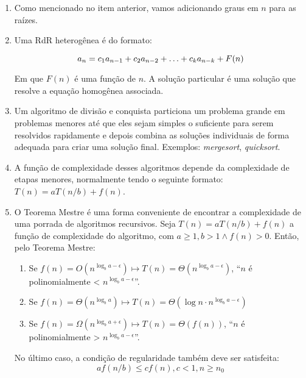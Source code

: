 \documentclass{article}
\begin{document}
\begin{enumerate}
	\item Como mencionado no item anterior, vamos adicionando graus em \( n \) para as raízes.

	\item Uma RdR heterogênea é do formato:

	      \[ a_n = c_1 a_{n-1} + c_2 a_{n-2} + \mathellipsis + c_k a_{n-k} + F(n)\]

	      Em que \( F(n) \) é uma função de \( n \). A solução particular é uma solução que resolve a equação homogênea associada.

	\item Um algoritmo de divisão e conquista particiona um problema grande em problemas menores até que eles sejam simples o suficiente para serem resolvidos rapidamente e depois combina as soluções individuais de forma adequada para criar uma solução final. Exemplos: \textit{mergesort}, \textit{quicksort}.

	\item A função de complexidade desses algoritmos depende da complexidade de etapas menores, normalmente tendo o seguinte formato: \( T(n) = aT(n/b) + f(n) \).

	\item O Teorema Mestre é uma forma conveniente de encontrar a complexidade de uma porrada de algoritmos recursivos. Seja \( T(n) = aT(n/b) + f(n) \) a função de complexidade do algoritmo, com \( a \geq 1, b > 1 \land f(n) > 0 \). Então, pelo Teorema Mestre:

	      \begin{enumerate}

		      \item Se \( f(n) = O(n^{\log_b {a- \epsilon}}) \mapsto T(n) = \Theta(n^{\log_b {a - \epsilon }})\), ``\( n \) é polinomialmente < \( n^{\log_b {a - \epsilon}} \)''.

		      \item Se \( f(n) = \Theta(n^{\log_b a}) \mapsto T(n) = \Theta( \log n \cdot n^{\log_b {a - \epsilon }})\)

		      \item Se \( f(n) = \Omega(n^{\log_b {a + \epsilon}}) \mapsto T(n) = \Theta(f(n))\), ``\( n \) é polinomialmente > \( n^{\log_b {a - \epsilon}} \)''.

	      \end{enumerate}

	      No último caso, a condição de regularidade também deve ser satisfeita:
	      \[ af(n/b) \leq cf(n), c < 1, n \geq n_0 \]


\end{enumerate}
\end{document}
